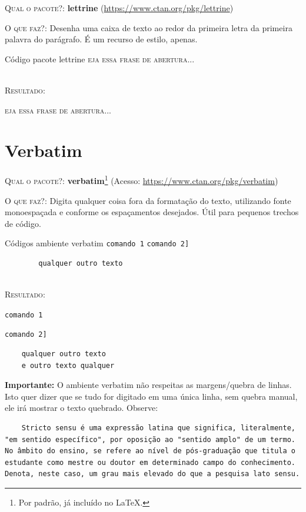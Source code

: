 \documentclass[a4paper,12pt,oneside,openright,extrafontsizes,openbib]{memoir}
\begin{document}
{\textsc{Qual o pacote?}: \textbf{lettrine} (\url{https://www.ctan.org/pkg/lettrine})

\textsc{O que faz?}: Desenha uma caixa de texto ao redor da primeira letra da primeira palavra do parágrafo. É um recurso de estilo, apenas.
\ \\

\begin{codex}{Código pacote lettrine}
\lettrine[findent=2pt]{}{eja essa frase de abertura...} \lipsum[1]
\end{codex}
\ \\

\textsc{Resultado}:

\lettrine[findent=2pt]{}{eja essa frase de abertura...} \lipsum[1]
 
\chapter{Verbatim}

\textsc{Qual o pacote?}: \textbf{verbatim}\footnote{Por padrão, já incluído no \LaTeX.} (Acesso: \url{https://www.ctan.org/pkg/verbatim})

\textsc{O que faz?}: Digita qualquer coisa fora da formatação do texto, utilizando fonte monoespaçada e conforme os espaçamentos desejados. Útil para pequenos trechos de código.
\ \\

\begin{codex}{Códigos ambiente verbatim}
	\verb|comando 1|
	\verb*|comando 2]|
	\begin{verbatim}
		qualquer outro texto
	\end{verbatim}
\end{codex}
\ \\
\textsc{Resultado}:

\verb|comando 1|

\verb*|comando 2]|

\begin{verbatim}
	qualquer outro texto
	e outro texto qualquer
\end{verbatim}

\textbf{Importante:} O ambiente verbatim não respeitas as margens/quebra de linhas. Isto quer dizer que se tudo for digitado em uma única linha, sem quebra manual, ele irá mostrar o texto quebrado. Observe:

\begin{verbatim}
	Stricto sensu é uma expressão latina que significa, literalmente, "em sentido específico", por oposição ao "sentido amplo" de um termo. No âmbito do ensino, se refere ao nível de pós-graduação que titula o estudante como mestre ou doutor em determinado campo do conhecimento. Denota, neste caso, um grau mais elevado do que a pesquisa lato sensu.
\end{verbatim}

}
\end{document}
